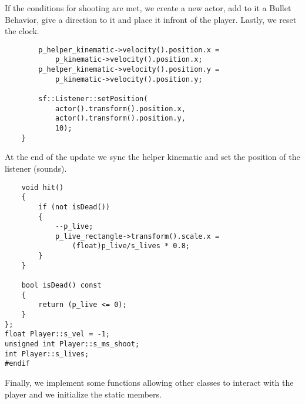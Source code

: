 If the conditions for shooting are met, we create a new actor, add to it a Bullet Behavior, 
give a direction to it and place it infront of the player. Lastly, we reset the clock.

\begin{lstlisting}
        p_helper_kinematic->velocity().position.x =
            p_kinematic->velocity().position.x;
        p_helper_kinematic->velocity().position.y =
            p_kinematic->velocity().position.y;

        sf::Listener::setPosition(
            actor().transform().position.x,
            actor().transform().position.y,
            10);
    }
\end{lstlisting}

At the end of the update we sync the helper kinematic and set the position of the listener (sounds).

\begin{lstlisting}
    void hit()
    {
        if (not isDead())
        {
            --p_live;
            p_live_rectangle->transform().scale.x =
                (float)p_live/s_lives * 0.8;
        }
    }

    bool isDead() const
    {
        return (p_live <= 0);
    }
};
float Player::s_vel = -1;
unsigned int Player::s_ms_shoot;
int Player::s_lives;
#endif
\end{lstlisting}

Finally, we implement some functions allowing other classes to interact with the player and 
we initialize the static members.
